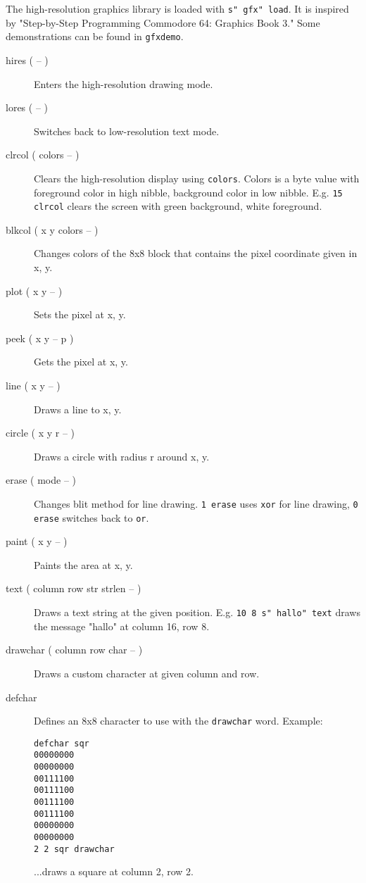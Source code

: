 The high-resolution graphics library is loaded with \texttt{s" gfx" load}. 
It is inspired by "Step-by-Step Programming Commodore 64: Graphics Book 3."
Some demonstrations can be found in \texttt{gfxdemo}. 
\begin{description}
\item[hires ( -- )] Enters the high-resolution drawing mode.
\item[lores ( -- )] Switches back to low-resolution text mode.
\item[clrcol ( colors -- )] Clears the high-resolution display using \texttt{colors}. Colors is a
byte value with foreground color in high nibble, background color in low nibble. E.g. \texttt{15
clrcol} clears the screen with green background, white foreground.
\item[blkcol ( x y colors -- )] Changes colors of the 8x8 block that contains the pixel coordinate given in x, y.
\item[plot ( x y -- )] Sets the pixel at x, y.
\item[peek ( x y -- p )] Gets the pixel at x, y.
\item[line ( x y -- )] Draws a line to x, y.
\item[circle ( x y r -- )] Draws a circle with radius r around x, y.
\item[erase ( mode -- )] Changes blit method for line drawing. \texttt{1 erase} uses \texttt{xor}
for line drawing, \texttt{0 erase} switches back to \texttt{or}.
\item[paint ( x y -- )] Paints the area at x, y.
\item[text ( column row str strlen -- )] Draws a text string at the given position. E.g. \texttt{10
8 s" hallo" text} draws the message "hallo" at column 16, row 8.
\item[drawchar ( column row char -- )] Draws a custom character at given column and row.
\item[defchar] Defines an 8x8 character to use with the \texttt{drawchar} word. Example:

\begin{verbatim}
defchar sqr
00000000
00000000
00111100
00111100
00111100
00111100
00000000
00000000
2 2 sqr drawchar
\end{verbatim}

...draws a square at column 2, row 2.
\end{description}
